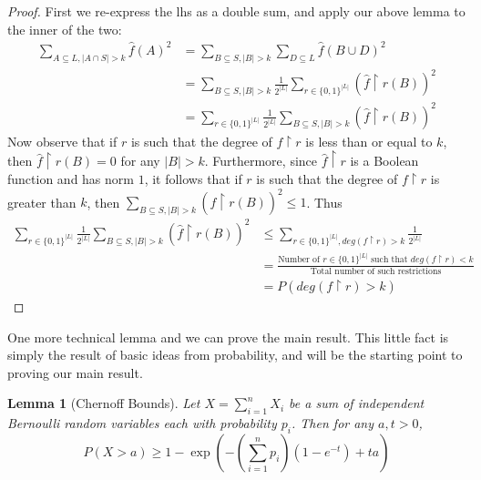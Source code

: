 \documentclass{article}
\theoremstyle{definition}
\theoremstyle{plain}
\theoremstyle{theorem}
\newtheorem{lemma}{Lemma}[section]
\begin{document}
\begin{proof}
	First we re-express the lhs as a double sum, and apply our above lemma to the inner of the two: 
	\begin{align*}
		\sum_{A \subseteq L, |A \cap S| > k} \hat{f}(A)^2 &= \sum_{B \subseteq S, |B| > k} \sum_{D \subseteq L} \hat{f}(B\cup D)^2 \\
		&= \sum_{B \subseteq S, |B| > k} \frac{1}{2^{|L|}} \sum_{r \in \{0,1\}^{|L|}} \left( \hat{f} \restriction r(B) \right)^2 \\
		&= \sum_{r \in \{0,1\}^{|L|}} \frac{1}{2^{|L|}} \sum_{B \subseteq S, |B| > k} \left( \hat{f}\restriction r(B) \right)^2
	\end{align*}
	Now observe that if $r$ is such that the degree of $f \restriction r$ is less than or equal to $k$, then $\hat{f} \restriction r (B) = 0$ for any $|B| > k$. Furthermore, since $\hat{f} \restriction r$ is a Boolean function and has norm $1$, it follows that if $r$ is such that the degree of $f \restriction r$ is greater than $k$, then $\sum_{B \subseteq S, |B| > k} \left(\hat{f} \restriction r(B)\right)^2 \leq 1$. Thus  
	\begin{align}
		\sum_{r \in \{0,1\}^{|L|}} \frac{1}{2^{|L|}} \sum_{B \subseteq S, |B| > k} \left( \hat{f}\restriction r(B) \right)^2 &\leq \sum_{r \in \{0,1\}^{|L|}, deg(f\restriction r) > k} \frac{1}{2^{|L|}}  \\
		&= \frac{\textrm{Number of $r \in \{0,1\}^{|L|}$ such that $deg(f \restriction r) < k$}}{\textrm{Total number of such restrictions}} \\
		&= P(deg(f \restriction r) > k)
	\end{align} 
\end{proof}
One more technical lemma and we can prove the main result. This little fact is simply the result of basic ideas from probability, and will be the starting point to proving our main result. 
\begin{lemma}[Chernoff Bounds]
	Let $X = \sum_{i=1}^n X_i$ be a sum of independent Bernoulli random variables each with probability $p_i$. Then for any $a,t > 0$, 
	\[ P(X > a) \geq 1-\exp\left(-\left(\sum_{i=1}^n p_i \right)(1-e^{-t})+ta\right) \]
\end{lemma}
\end{document}

